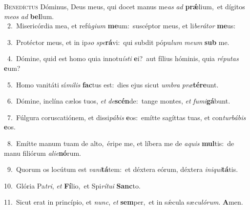 \lettrine{\initial\textcolor{\initialcolor}{B}}{enedíctus} Dóminus, Deus meus, qui docet manus me\textit{as} \textit{ad} \textbf{prǽ}\-lium,~\star et dígitos \textit{me}\-\textit{os} \textit{ad} \textbf{bel}\-lum.\\
{\numbfont\textcolor{\numbcolor}{~2.}}~Misericórdia mea, et refú\-\textit{gi}\-\textit{um} \textbf{me}\-um:~\star suscéptor meus, et li\-\textit{be}\-\textit{rá}\textit{tor} \textbf{me}\-us:\par
{\numbfont\textcolor{\numbcolor}{~3.}}~Protéctor meus, et in ip\textit{so} \textit{spe}\-\textbf{rá}vi:~\star qui subdit pópu\textit{lum} \textit{me}\-\textit{um} \textbf{sub} me.\par
{\numbfont\textcolor{\numbcolor}{~4.}}~Dómine, quid est homo quia innotu\-\textit{ís}\-\textit{ti} \textbf{e}\-i?~\star aut fílius hóminis, quia \textit{ré}\-\textit{pu}\textit{tas} \textbf{e}\-um?\par
{\numbfont\textcolor{\numbcolor}{~5.}}~Homo vanitáti sí\-\textit{mi}\-\textit{lis} \textbf{fac}\-tus est:~\star dies ejus sicut \textit{um}\-\textit{bra} \textit{præ}\-\textbf{tér}\textbf{e}unt.\par
{\numbfont\textcolor{\numbcolor}{~6.}}~Dómine, inclína cælos tuos, \textit{et} \textit{de}\-\textbf{scén}de:~\star tange montes, \textit{et} \textit{fu}\-\textit{mi}\textbf{gá}bunt.\par
{\numbfont\textcolor{\numbcolor}{~7.}}~Fúlgura coruscatiónem, et dissi\-\textit{pá}\-\textit{bis} \textbf{e}\-os:~\star emítte sagíttas tuas, et con\-\textit{tur}\-\textit{bá}\textit{bis} \textbf{e}\-os.\par
{\numbfont\textcolor{\numbcolor}{~8.}}~Emítte manum tuam de alto,~\dagger éripe me, et líbera me de \textit{a}\-\textit{quis} \textbf{mul}\-tis:~\star de manu filiórum \textit{a}\-\textit{li}\textit{e}\textbf{nó}rum.\par
{\numbfont\textcolor{\numbcolor}{~9.}}~Quorum os locútum est \textit{va}\-\textit{ni}\textbf{tá}tem:~\star et déxtera eórum, déxtera \textit{in}\-\textit{i}\textit{qui}\textbf{tá}tis.\par
{\numbfont\textcolor{\numbcolor}{10.}}~Glória Pa\-\textit{tri}\-, \textit{et} \textbf{Fí}\-lio,~\star et Spi\-\textit{rí}\-\textit{tu}\textit{i} \textbf{Sanc}\-to.\par
{\numbfont\textcolor{\numbcolor}{11.}}~Sicut erat in princípio, et \textit{nunc}\-, \textit{et} \textbf{sem}\-per,~\star et in sǽcula sæ\-\textit{cu}\-\textit{ló}\textit{rum}. \textbf{A}\-men.\par
